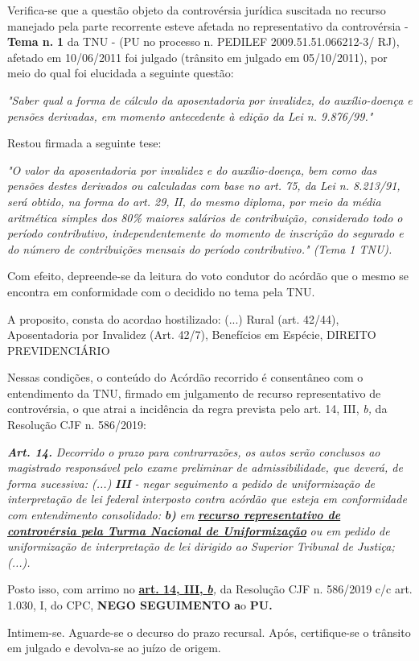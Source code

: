\documentclass[12pt]{article}
\begin{document}
\justifying
\noindent Verifica-se que a questão objeto da controvérsia jurídica suscitada no recurso manejado pela parte recorrente esteve afetada no representativo da controvérsia - \textbf{Tema n. }\textbf{1} da TNU - (PU no processo n. PEDILEF 2009.51.51.066212-3/ RJ),  afetado em 10/06/2011 foi julgado (trânsito em julgado em 05/10/2011), por meio do qual foi elucidada a seguinte questão:

\noindent \textit{"Saber qual a forma de cálculo da aposentadoria por invalidez, do auxílio-doença e pensões derivadas, em momento antecedente à edição da Lei n. 9.876/99."}

\noindent Restou firmada a seguinte tese:

\noindent \textit{"O valor da aposentadoria por invalidez e do auxílio-doença, bem como das pensões destes derivados ou calculadas com base no art. 75, da Lei n. 8.213/91, será obtido, na forma do art. 29, II, do mesmo diploma, por meio da média aritmética simples dos 80\% maiores salários de contribuição, considerado todo o período contributivo, independentemente do momento de inscrição do segurado e do número de contribuições mensais do período contributivo." (Tema 1 TNU).}

\noindent Com efeito, depreende-se da leitura do voto condutor do acórdão que o mesmo se encontra em conformidade com o decidido no  tema pela TNU.

\noindent A proposito, consta do acordao hostilizado: (...) Rural (art. 42/44), Aposentadoria por Invalidez (Art. 42/7), Benefícios em Espécie, DIREITO PREVIDENCIÁRIO

\noindent Nessas condições, o conteúdo do Acórdão recorrido é consentâneo com o entendimento da TNU, firmado em julgamento de recurso representativo de controvérsia, o que atrai a incidência da regra prevista pelo art. 14, III, \textit{b,} da Resolução CJF n. 586/2019:

\noindent \textit{\textbf{Art. 14.}}\textit{ Decorrido o prazo para contrarrazões, os autos serão conclusos ao magistrado responsável pelo exame preliminar de admissibilidade, que deverá, de forma sucessiva: (...) }\textit{\textbf{III }}\textit{- negar seguimento a pedido de uniformização de interpretação de lei federal interposto contra acórdão que esteja em conformidade com entendimento consolidado: }\textit{\textbf{b)}}\textit{ em }\uline{\textit{\textbf{recurso representativo de controvérsia pela Turma Nacional de Uniformização}}}\textit{ ou em pedido de uniformização de interpretação de lei dirigido ao Superior Tribunal de Justiça;(...).}

\noindent Posto isso, com arrimo no \uline{\textbf{art. 14, III, }}\uline{\textit{\textbf{b}}}\textit{,} da Resolução CJF n. 586/2019 c/c art. 1.030, I, do CPC, \textbf{NEGO SEGUIMENTO }\textbf{a}o\textbf{ PU}\textbf{.}

\noindent Intimem-se. Aguarde-se o decurso do prazo recursal. Após, certifique-se o trânsito em julgado e devolva-se ao juízo de origem.
\end{document}
